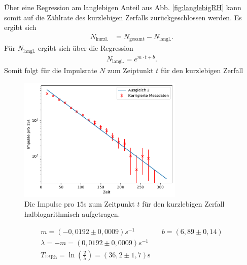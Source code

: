 Über eine Regression am langlebigen Anteil aus Abb. \ref{fig:langlebigRH} kann somit
auf die Zählrate des kurzlebigen Zerfalls zurückgeschlossen werden.
Es ergibt sich
\begin{align}
    N_{\text{kurzl.}}&=N_{\text{gesamt}}-N_{\text{langl.}}.
\end{align} 
Für $N_{\text{langl.}}$ ergibt sich über die Regression
\begin{align}
   N _{\text{langl.}}=e^{m \cdot t +b}.
\end{align}
Somit folgt für die Impulsrate $N$ zum Zeiptunkt $t$ für den kurzlebigen Zerfall
\begin{figure}
    \centering
    \includegraphics[width=0.7\textwidth]{plots/Rhodium_kurz.pdf}
    \caption{Die Impulse pro $15$s zum Zeitpunkt $t$ für den kurzlebigen Zerfall halblogarithmisch aufgetragen.}
\end{figure}
\begin{align*}
     m = (-0,0192 \pm 0,0009)\si{s^{-1}} && b = (6,89 \pm 0,14) \\
    \lambda = -m = (0,0192 \pm 0,0009)\si{s^{-1}} \\
    T_{^{104}\text{Rh}} = \ln\left( \frac{2}{\lambda} \right) = (36,2 \pm 1,7) \text{s}
\end{align*}

